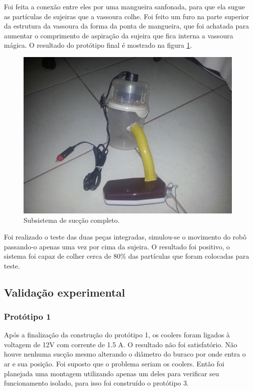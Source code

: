 		Foi feita a conexão entre eles por uma mangueira sanfonada, para que ela sugue as partículas de sujeiras que a vassoura colhe. Foi feito um furo na parte superior da estrutura da vassoura da forma da ponta de mangueira, que foi achatada para aumentar o comprimento de aspiração da sujeira que fica interna a vassoura mágica. O resultado do protótipo final é mostrado na figura \ref{img:sistema_completo}.

		\begin{figure}[H]
			\centering
			\includegraphics[scale=1]{figuras/asppc2_13.jpg}
			\caption{Subsistema de sucção completo.}
			\label{img:sistema_completo}
		\end{figure}

		Foi realizado o teste das duas peças integradas, simulou-se o movimento do robô passando-o apenas uma vez por cima da sujeira. O resultado foi positivo, o sistema foi capaz de colher cerca de 80\% das partículas que foram colocadas para teste.

\subsection{Validação experimental} %
	\label{sub:validação_experimental}

\subsubsection{Protótipo 1}
Após a finalização da construção do protótipo 1, os coolers foram ligados à voltagem de 12V com corrente de 1.5 A. O resultado não foi satisfatório. Não houve nenhuma sucção mesmo alterando o diâmetro do buraco por onde entra o ar e sua posição. Foi suposto que o problema seriam os coolers. Então foi planejada uma montagem utilizando apenas um deles para verificar seu funcionamento isolado, para isso foi construído o protótipo 3. 

